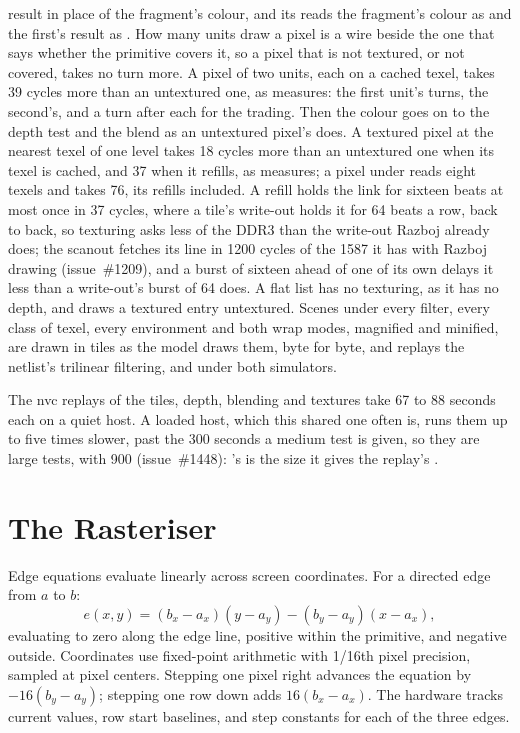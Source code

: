 \documentclass[journal,9pt]{IEEEtran}
\begin{document}
result in place of the fragment's colour, and its  reads
the fragment's colour as  and the first's result as
. How many units draw a pixel is a wire beside the one
that says whether the primitive covers it, so a pixel that is not
textured, or not covered, takes no turn more. A pixel of two units, each on a
cached texel, takes 39 cycles more than an untextured one, as
 measures: the first unit's turns,
the second's, and a turn after each for the trading.
Then the colour
goes on to the depth test and the blend as an untextured pixel's does.
A textured pixel at the nearest texel of one level takes 18 cycles more
than an untextured one when its texel is cached, and 37 when it
refills, as  measures; a pixel
under  reads eight texels and takes 76,
its refills included. A refill holds the link for sixteen beats at most once in 37
cycles, where a tile's write-out holds it for 64 beats a row, back to
back, so texturing asks less of the DDR3 than the write-out Razboj
already does; the scanout fetches its line in 1200 cycles of the 1587
it has with Razboj drawing (issue~\#1209), and a burst of sixteen ahead
of one of its own delays it less than a write-out's burst of 64 does. A
flat list has no texturing, as it has no depth, and draws a textured
entry untextured. Scenes under every filter, every class of texel,
every environment and both wrap modes, magnified and minified, are
drawn in tiles as the model draws them, byte for byte, and
 replays the netlist's trilinear filtering,
 and  under both simulators.

The nvc replays of the tiles, depth, blending and textures take 67
to 88 seconds each on a quiet host. A loaded host, which this shared
one often is, runs them up to five times slower, past the 300 seconds
a medium test is given, so they are large tests, with 900
(issue~\#1448): 's  is the size
it gives the replay's .

\section{The Rasteriser}
\label{sec:g-raster}

Edge equations evaluate linearly across screen coordinates. For a directed
edge from \(a\) to \(b\):
\[ e(x, y) = (b_x - a_x)(y - a_y) - (b_y - a_y)(x - a_x), \]
evaluating to zero along the edge line, positive within the primitive, and
negative outside. Coordinates use fixed-point arithmetic with 1/16th pixel
precision, sampled at pixel centers. Stepping one pixel right advances the
equation by \(-16(b_y - a_y)\); stepping one row down adds \(16(b_x - a_x)\).
The hardware tracks current values, row start baselines, and step constants
for each of the three edges.
\end{document}
